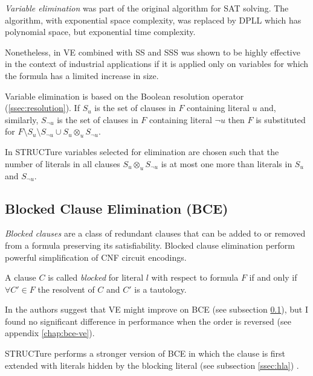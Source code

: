 \emph{Variable elimination} \cite{Davis:1960:CPQ:321033.321034}
was part of the original algorithm for SAT solving. The algorithm,
with exponential space complexity, was replaced by DPLL which
has polynomial space, but exponential time complexity.

Nonetheless, in
\cite{Subbarayan04niver:non,Een05effectivepreprocessing} VE combined
with SS and SSS was shown to be highly effective in the context
of industrial applications if it is applied only on variables for
which the formula has a limited increase in size.

Variable elimination is based on the Boolean resolution operator
(\ref{ssec:resolution}). If $S_u$ is the set of clauses in $F$
containing literal $u$ and, similarly, $S_{\neg u}$ is the set of clauses in $F$
containing literal ${\neg u}$ then $F$ is substituted for
$F \setminus S_u \setminus S_{\neg u} \cup S_u \otimes_{u} S_{\neg u}$.

In STRUCTure variables selected for elimination are chosen such that
the number of literals in all clauses $S_u \otimes_{u} S_{\neg u}$
is at most one more than literals in $S_u$ and $S_{\neg u}$.


\subsection{Blocked Clause Elimination (BCE)}
\label{ssec:bce}

\emph{Blocked clauses} are a class of redundant clauses
that can be added to \cite{Kullmann:1999:NMD:312269.312271} or
removed from \cite{Jarvisalo_blockedclause} a formula preserving
its satisfiability. Blocked clause elimination perform powerful
simplification of CNF circuit encodings.

\begin{mydef}
  A clause $C$ is called \emph{blocked}
  for literal $l$ with respect to formula $F$ if and only if $\forall
  C' \in F$ the resolvent of $C$ and $C'$ is a tautology.
\end{mydef}

In \cite{Jarvisalo_blockedclause} the authors suggest that VE might
improve on BCE (see subsection \ref{ssec:bce}), but I found no
significant difference in performance when the order is reversed
(see appendix \ref{chap:bce-ve}).

STRUCTure performs a stronger version of BCE in which the clause
is first extended with literals hidden by the blocking literal
(see subsection \ref{ssec:hla}) \cite{Heule_coveredclause}.
